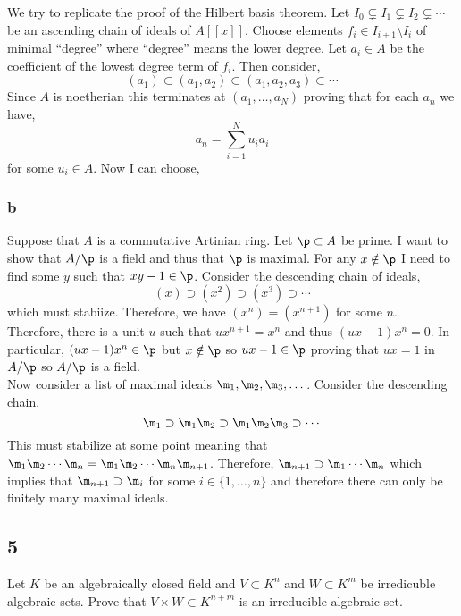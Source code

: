 \documentclass[12pt]{article}
\begin{document}
We try to replicate the proof of the Hilbert basis theorem. Let $I_0 \subsetneq I_1 \subsetneq I_2 \subsetneq \cdots$ be an ascending chain of ideals of $A[[x]]$. Choose elements $f_i \in I_{i+1} \setminus I_i$ of minimal ``degree'' where ``degree'' means the lower degree. Let $a_i \in A$ be the coefficient of the lowest degree term of $f_i$. Then consider,
\[ (a_1) \subset (a_1, a_2) \subset (a_1, a_2, a_3) \subset \cdots \]
Since $A$ is noetherian this terminates at $(a_1, \dots, a_N)$ proving that for each $a_n$ we have,
\[ a_n = \sum_{i = 1}^N u_i a_i \]
for some $u_i \in A$. Now I can choose,




\subsubsection{b}

Suppose that $A$ is a commutative Artinian ring. Let $\p \subset A$ be prime. I want to show that $A / \p$ is a field and thus that $\p$ is maximal. For any $x \notin \p$ I need to find some $y$ such that $xy - 1 \in \p$. Consider the descending chain of ideals,
\[ (x) \supset (x^2) \supset (x^3) \supset \cdots \]
which must stabiize. Therefore, we have $(x^n) = (x^{n+1})$ for some $n$. Therefore, there is a unit $u$ such that $u x^{n+1} = x^n$ and thus $(ux - 1) x^n = 0$. In particular, $(ux - 1) x^n \in \p$ but $x \notin \p$ so $ux - 1 \in \p$ proving that $ux = 1$ in $A / \p$ so $A / \p$ is a field.
\bigskip\\
Now consider a list of maximal ideals $\m_1, \m_2, \m_3, \dots$. Consider the descending chain,
\[ \m_1 \supset \m_1 \m_2 \supset \m_1 \m_2 \m_3 \supset \cdots \]
This must stabilize at some point meaning that $\m_1 \m_2 \cdots \m_n = \m_1 \m_2 \cdots \m_n \m_{n+1}$. Therefore, $\m_{n+1} \supset \m_1 \cdots \m_n$ which implies that $\m_{n+1} \supset \m_i$ for some $i \in \{1, \dots, n\}$ and therefore there can only be finitely many maximal ideals. 

\subsection{5}


\begin{exercise}
Let $K$ be an algebraically closed field and $V \subset K^n$ and $W \subset K^m$ be irredicuble algebraic sets. Prove that $V \times W \subset K^{n+m}$ is an irreducible algebraic set.
\end{exercise}
\end{document}
